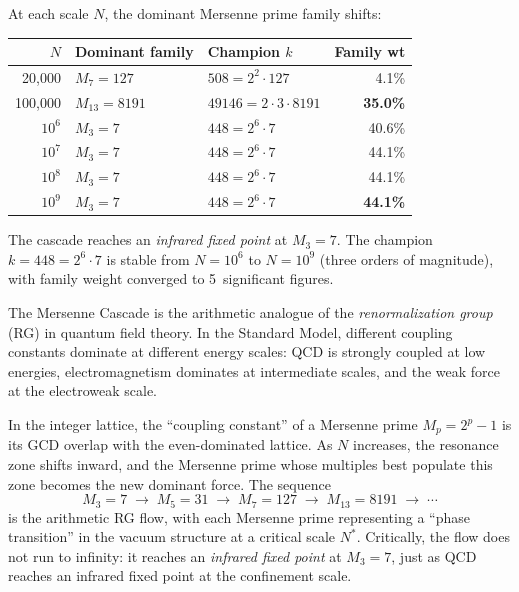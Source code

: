 \documentclass[11pt,a4paper]{article}
\begin{document}
\begin{observation}
\label{obs:cascade}
At each scale $N$, the dominant Mersenne prime family shifts:
\begin{center}
\begin{tabular}{@{}rllr@{}}
\toprule
$N$ & Dominant family & Champion $k$ & Family wt \\
\midrule
20{,}000     & $M_7 = 127$ & $508 = 2^2 \cdot 127$ & 4.1\% \\
100{,}000    & $M_{13} = 8191$ & $49146 = 2 \cdot 3 \cdot 8191$ & \textbf{35.0\%} \\
$10^6$       & $M_3 = 7$ & $448 = 2^6 \cdot 7$ & 40.6\% \\
$10^7$       & $M_3 = 7$ & $448 = 2^6 \cdot 7$ & 44.1\% \\
$10^8$       & $M_3 = 7$ & $448 = 2^6 \cdot 7$ & 44.1\% \\
$10^9$       & $M_3 = 7$ & $448 = 2^6 \cdot 7$ & \textbf{44.1\%} \\
\bottomrule
\end{tabular}
\end{center}
The cascade reaches an \emph{infrared fixed point} at $M_3 = 7$.
The champion $k = 448 = 2^6 \cdot 7$ is stable from $N = 10^6$ to
$N = 10^9$ (three orders of magnitude), with family weight converged
to 5~significant figures.
\end{observation}

\begin{correspondence}
The Mersenne Cascade is the arithmetic analogue of the
\emph{renormalization group} (RG) in quantum field theory.
In the Standard Model, different coupling constants dominate at
different energy scales: QCD is strongly coupled at low energies,
electromagnetism dominates at intermediate scales, and the weak
force at the electroweak scale.

In the integer lattice, the ``coupling constant'' of a Mersenne prime
$M_p = 2^p - 1$ is its GCD overlap with the even-dominated lattice.
As $N$ increases, the resonance zone shifts inward, and the Mersenne
prime whose multiples best populate this zone becomes the new dominant
force. The sequence
\[
  M_3 = 7 \;\to\; M_5 = 31 \;\to\; M_7 = 127 \;\to\; M_{13} = 8191
  \;\to\; \cdots
\]
is the arithmetic RG flow, with each Mersenne prime representing a
``phase transition'' in the vacuum structure at a critical scale $N^*$.
Critically, the flow does not run to infinity: it reaches an
\emph{infrared fixed point} at $M_3 = 7$, just as QCD reaches
an infrared fixed point at the confinement scale.
\end{correspondence}
\end{document}
